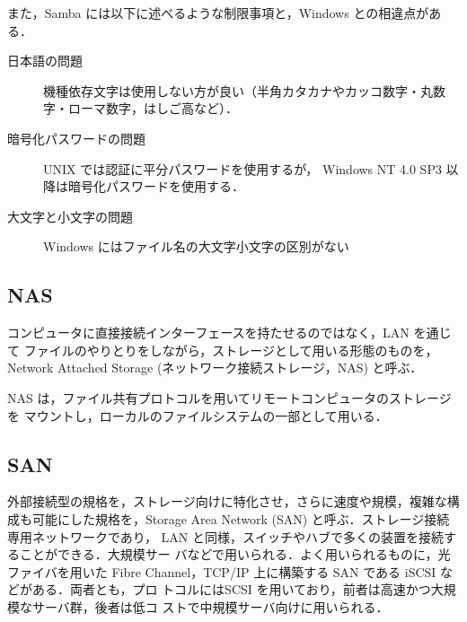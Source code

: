 また，Samba には以下に述べるような制限事項と，Windows との相違点がある．
\begin{description}
\item[日本語の問題] 機種依存文字は使用しない方が良い（半角カタカナやカッコ数字・丸数字・ローマ数字，はしご高など）．
\item[暗号化パスワードの問題] UNIX では認証に平分パスワードを使用するが， Windows NT 4.0 SP3 以降は暗号化パスワードを使用する．
\item[大文字と小文字の問題] Windows にはファイル名の大文字小文字の区別がない
\end{description}

%

\subsection*{NAS}

コンピュータに直接接続インターフェースを持たせるのではなく，LAN を通じて
ファイルのやりとりをしながら，ストレージとして用いる形態のものを，Network 
Attached Storage (ネットワーク接続ストレージ，NAS) と呼ぶ．

NAS は，ファイル共有プロトコルを用いてリモートコンピュータのストレージを
マウントし，ローカルのファイルシステムの一部として用いる．


\subsection*{SAN}

外部接続型の規格を，ストレージ向けに特化させ，さらに速度や規模，複雑な構
成も可能にした規格を，Storage Area Network (SAN) と呼ぶ．ストレージ接続専用ネットワークであり，
LAN と同様，スイッチやハブで多くの装置を接続することができる．大規模サー
バなどで用いられる．よく用いられるものに，光ファイバを用いた Fibre
Channel，TCP/IP 上に構築する SAN である iSCSI などがある．両者とも，プロ
トコルにはSCSI を用いており，前者は高速かつ大規模なサーバ群，後者は低コ
ストで中規模サーバ向けに用いられる．


